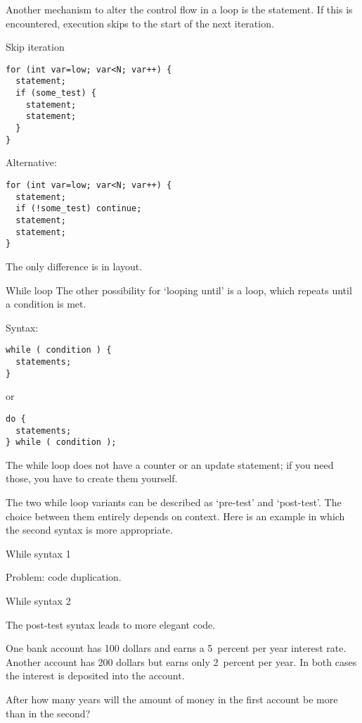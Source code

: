 Another mechanism to alter the control flow in a loop is the
 statement. If this is encountered, execution
skips to the start of the next iteration.

\begin{block}{Skip iteration}
  \label{sl:for-cont}
\begin{verbatim}
for (int var=low; var<N; var++) {
  statement;
  if (some_test) {
    statement;
    statement;
  }
}
\end{verbatim}
Alternative:
\begin{verbatim}
for (int var=low; var<N; var++) {
  statement;
  if (!some_test) continue;
  statement;
  statement;
}
\end{verbatim}
The only difference is in layout.
\end{block}

\begin{block}{While loop}
  \label{sl:while}
  The other possibility for `looping until' is a
   loop, which repeats until a condition is met.

  Syntax:
\begin{verbatim}
while ( condition ) {
  statements;
}
\end{verbatim}
or
\begin{verbatim}
do {
  statements;
} while ( condition );
\end{verbatim}
The while loop does not have a counter or an update statement; if you
need those, you have to create them yourself.
\end{block}

The two while loop variants can be described as `pre-test' and
`post-test'. The choice between them entirely depends on context. Here
is an example in which the second syntax is more appropriate.

\begin{block}{While syntax 1}
  \label{sl:while2}

  Problem: code duplication.
\end{block}

\begin{block}{While syntax 2}
  \label{sl:while3}

  The post-test syntax leads to more elegant code.
\end{block}

\begin{exercise}
  \label{ex:interest}
  One bank account has 100 dollars and earns a 5~percent per year interest
  rate. Another account has 200 dollars but earns only 2~percent per
  year. In both cases the interest is deposited into the account.
  
  After how many years will the amount of money in the first account
  be more than in the second?
\end{exercise}

